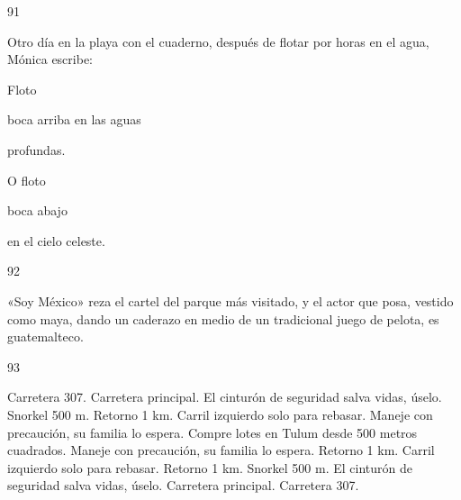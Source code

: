 \documentclass[12pt,twoside,openright,a5paper]{book}
\begin{document}
\hrulefill \hspace{0.1cm}\decofourleft\hspace{0.2cm} 91 \hspace{0.2cm}\decofourright \hspace{0.1cm}\hrulefill

\nopagebreak

\vspace{0.5cm}

\nopagebreak

Otro día en la playa con el cuaderno, después de
flotar por horas en el agua, Mónica escribe:

\vspace{0.5cm}

Floto

boca arriba en las aguas

profundas.

O floto

boca abajo

en el cielo celeste.

\vspace{0.5cm}

\hrulefill \hspace{0.1cm}\decofourleft\hspace{0.2cm} 92 \hspace{0.2cm}\decofourright \hspace{0.1cm}\hrulefill

\nopagebreak

\vspace{0.5cm}

\nopagebreak

«Soy México» reza el cartel del parque más visitado, y el actor que posa,
vestido como maya, dando un caderazo en medio de un tradicional juego de
pelota, es guatemalteco.

\vspace{0.5cm}

\hrulefill \hspace{0.1cm}\decofourleft\hspace{0.2cm} 93 \hspace{0.2cm}\decofourright \hspace{0.1cm}\hrulefill

\nopagebreak

\vspace{0.5cm}

\nopagebreak

Carretera 307. Carretera principal. El cinturón de seguridad salva
vidas, úselo. Snorkel 500 m. Retorno 1 km. Carril izquierdo solo para
rebasar. Maneje con precaución, su familia lo espera. Compre lotes en Tulum 
desde 500 metros cuadrados. Maneje con precaución, su familia lo espera.
Retorno 1 km. Carril izquierdo solo para
rebasar.
Retorno 1 km.
Snorkel 500 m.
El cinturón de seguridad salva
vidas, úselo.
Carretera principal.
Carretera 307.
\end{document}
